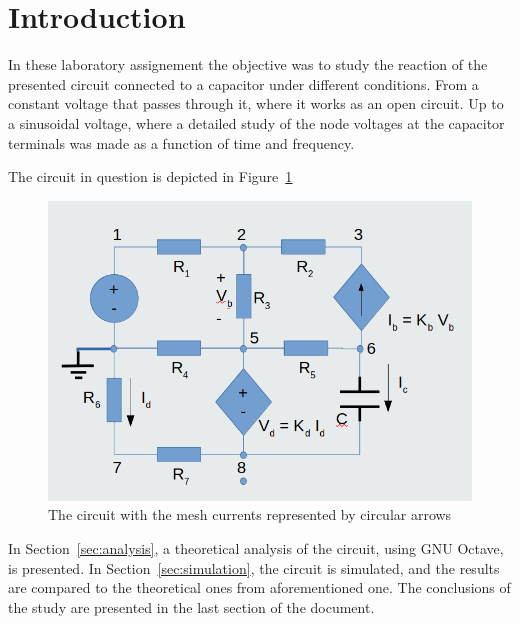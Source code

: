 \section{Introduction}
\label{sec:introduction}


\par In these laboratory assignement the objective was to study the reaction of the presented circuit connected to a capacitor under different conditions. From a constant voltage that passes through it, where it works as an open circuit. Up to a sinusoidal voltage, where a detailed study of the node voltages at the capacitor terminals was made as a function of time and frequency. 

\par The circuit in question is depicted in Figure~\ref{fig:circuit} 

\begin{figure}
  \includegraphics[width=\linewidth]{circuit.png}
  \caption{The circuit with the mesh currents represented by circular arrows}
  \label{fig:circuit}
\end{figure}


\par In Section~\ref{sec:analysis}, a theoretical analysis of the circuit, using GNU Octave,  is presented. In Section~\ref{sec:simulation}, the circuit is simulated, and the results are compared to the theoretical ones from
aforementioned one. The conclusions of the study are presented in the last section of the document.

